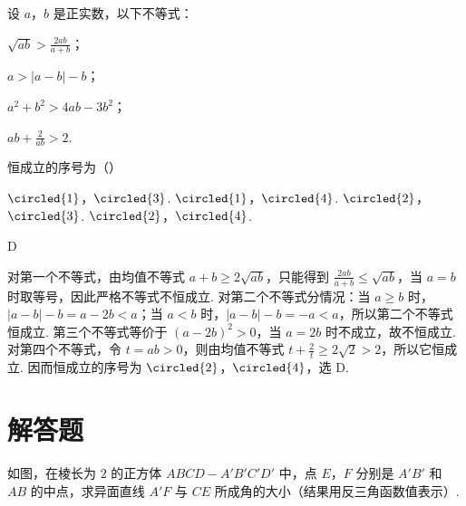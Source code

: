 \begin{problem}
设 \(a\)，\(b\) 是正实数，以下不等式：

\begin{circlelist}
\item \(\sqrt{ab}>\frac{2ab}{a+b}\)；
\item \(a>|a-b|-b\)；
\item \(a^2+b^2>4ab-3b^2\)；
\item \(ab+\frac{2}{ab}>2\).
\end{circlelist}

恒成立的序号为（\quad）

\choices
    {\(\circled{1}\)，\(\circled{3}\).}
    {\(\circled{1}\)，\(\circled{4}\).}
    {\(\circled{2}\)，\(\circled{3}\).}
    {\(\circled{2}\)，\(\circled{4}\).}
\end{problem}

\begin{answer}
D
\end{answer}

\begin{solution}
对第一个不等式，由均值不等式 \(a+b\geqslant2\sqrt{ab}\)，只能得到 \(\frac{2ab}{a+b}\leqslant\sqrt{ab}\)，当 \(a=b\) 时取等号，因此严格不等式不恒成立. 对第二个不等式分情况：当 \(a\geqslant b\) 时，\(|a-b|-b=a-2b<a\)；当 \(a<b\) 时，\(|a-b|-b=-a<a\)，所以第二个不等式恒成立. 第三个不等式等价于 \((a-2b)^2>0\)，当 \(a=2b\) 时不成立，故不恒成立. 对第四个不等式，令 \(t=ab>0\)，则由均值不等式 \(t+\frac{2}{t}\geqslant2\sqrt2>2\)，所以它恒成立. 因而恒成立的序号为 \(\circled{2}\)，\(\circled{4}\)，选 D.
\end{solution}

\section{解答题}

\begin{problem}
如图，在棱长为 \(2\) 的正方体 \(ABCD-A'B'C'D'\) 中，点 \(E\)，\(F\) 分别是 \(A'B'\) 和 \(AB\) 的中点，求异面直线 \(A'F\) 与 \(CE\) 所成角的大小（结果用反三角函数值表示）.

\end{problem}

